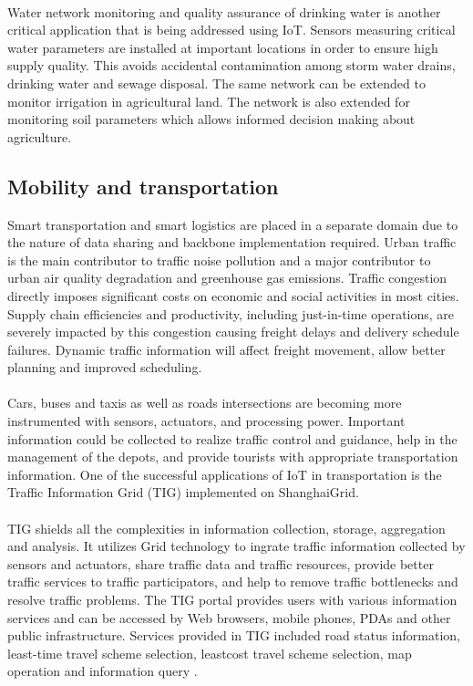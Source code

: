 \documentclass[10pt, twocolumn]{article}
\begin{document}
\paragraph{}
Water network monitoring and quality assurance of drinking water is another critical application that is being addressed using IoT. Sensors measuring critical water parameters are installed at important locations in order to ensure high supply quality. This avoids accidental contamination among storm water drains, drinking water and sewage disposal. The same network can be extended to monitor irrigation in agricultural land. The network is also extended for monitoring soil parameters which allows informed decision making about agriculture.
\subsection{Mobility and transportation}
Smart transportation and smart logistics are placed in a separate domain due to the nature of data sharing and backbone implementation required. Urban traffic is the main contributor to traffic noise pollution and a major contributor to urban air quality degradation and greenhouse gas emissions. Traffic congestion directly imposes significant costs on economic and social activities in most cities. Supply chain efficiencies and productivity, including just-in-time operations, are severely impacted by this congestion causing freight delays and delivery schedule failures. Dynamic traffic information will affect freight movement, allow better planning and improved scheduling. \cite{ref1}
\paragraph{}
Cars, buses and taxis as well as roads intersections are becoming more instrumented with sensors, actuators, and processing power. Important information could be collected to realize traffic control and guidance, help in the management of the depots, and provide tourists with appropriate transportation information. One of the successful applications of IoT in transportation is the Traffic Information Grid (TIG) implemented on ShanghaiGrid.
\paragraph{}
TIG shields all the complexities in information collection, storage, aggregation and analysis. It utilizes Grid technology to ingrate traffic information collected by sensors and actuators, share traffic data and traffic resources, provide better traffic services to traffic participators, and help to remove traffic bottlenecks and resolve traffic problems. The TIG portal provides users with various information services and can be accessed by Web browsers, mobile phones, PDAs and other public infrastructure. Services provided in TIG included road status information, least-time travel scheme selection, leastcost travel scheme selection, map operation and information query \cite{ref7}.
\end{document}
